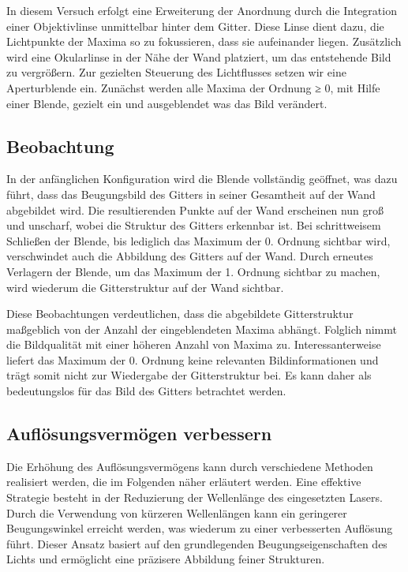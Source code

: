 In diesem Versuch erfolgt eine Erweiterung der Anordnung durch die Integration einer Objektivlinse unmittelbar hinter dem Gitter. Diese Linse dient dazu, die Lichtpunkte der Maxima so zu fokussieren, dass sie aufeinander liegen. Zusätzlich wird eine Okularlinse in der Nähe der Wand platziert, um das entstehende Bild zu vergrößern. Zur gezielten Steuerung des Lichtflusses setzen wir eine Aperturblende ein. Zunächst werden alle Maxima der Ordnung ≥ 0, mit Hilfe einer Blende, gezielt ein und ausgeblendet was das Bild verändert.


\subsection{Beobachtung}
In der anfänglichen Konfiguration wird die Blende vollständig geöffnet, was dazu führt, dass das Beugungsbild des Gitters in seiner Gesamtheit auf der Wand abgebildet wird. Die resultierenden Punkte auf der Wand erscheinen nun groß und unscharf, wobei die Struktur des Gitters erkennbar ist. Bei schrittweisem Schließen der Blende, bis lediglich das Maximum der 0. Ordnung sichtbar wird, verschwindet auch die Abbildung des Gitters auf der Wand. Durch erneutes Verlagern der Blende, um das Maximum der 1. Ordnung sichtbar zu machen, wird wiederum die Gitterstruktur auf der Wand sichtbar.

Diese Beobachtungen verdeutlichen, dass die abgebildete Gitterstruktur maßgeblich von der Anzahl der eingeblendeten Maxima abhängt. Folglich nimmt die Bildqualität mit einer höheren Anzahl von Maxima zu. Interessanterweise liefert das Maximum der 0. Ordnung keine relevanten Bildinformationen und trägt somit nicht zur Wiedergabe der Gitterstruktur bei. Es kann daher als bedeutungslos für das Bild des Gitters betrachtet werden.

\subsection{Auflösungsvermögen verbessern}
Die Erhöhung des Auflösungsvermögens kann durch verschiedene Methoden realisiert werden, die im Folgenden näher erläutert werden. Eine effektive Strategie besteht in der Reduzierung der Wellenlänge des eingesetzten Lasers. Durch die Verwendung von kürzeren Wellenlängen kann ein geringerer Beugungswinkel erreicht werden, was wiederum zu einer verbesserten Auflösung führt. Dieser Ansatz basiert auf den grundlegenden Beugungseigenschaften des Lichts und ermöglicht eine präzisere Abbildung feiner Strukturen.

